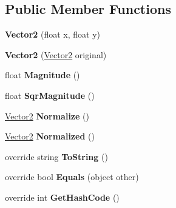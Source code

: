 \subsection*{Public Member Functions}
\begin{DoxyCompactItemize}
\item 
\mbox{\label{class_pillar3_d_1_1_vector2_abaaf6ec2638337b80154c0cf4ba19e45}} 
{\bfseries Vector2} (float x, float y)
\item 
\mbox{\label{class_pillar3_d_1_1_vector2_ad5348ad15457aa733e6d87a313de299b}} 
{\bfseries Vector2} (\hyperlink{class_pillar3_d_1_1_vector2}{Vector2} original)
\item 
\mbox{\label{class_pillar3_d_1_1_vector2_ac12b5df437a5d5a8a91cda9a4d76ac17}} 
float {\bfseries Magnitude} ()
\item 
\mbox{\label{class_pillar3_d_1_1_vector2_a77487bd2b0dfb7060bf2a9a76400f848}} 
float {\bfseries Sqr\+Magnitude} ()
\item 
\mbox{\label{class_pillar3_d_1_1_vector2_ac9a012cfe0280aa940903ddfc7f9f0a5}} 
\hyperlink{class_pillar3_d_1_1_vector2}{Vector2} {\bfseries Normalize} ()
\item 
\mbox{\label{class_pillar3_d_1_1_vector2_a8624d01486dd3a3ee0f38c3a08a3cc6a}} 
\hyperlink{class_pillar3_d_1_1_vector2}{Vector2} {\bfseries Normalized} ()
\item 
\mbox{\label{class_pillar3_d_1_1_vector2_a0522c8831f61d887d744faa890cf0c31}} 
override string {\bfseries To\+String} ()
\item 
\mbox{\label{class_pillar3_d_1_1_vector2_a5863668e2bf329cf661790d53c33976f}} 
override bool {\bfseries Equals} (object other)
\item 
\mbox{\label{class_pillar3_d_1_1_vector2_a19efd9e2a774fd8e5822ec988eb03229}} 
override int {\bfseries Get\+Hash\+Code} ()
\end{DoxyCompactItemize}

